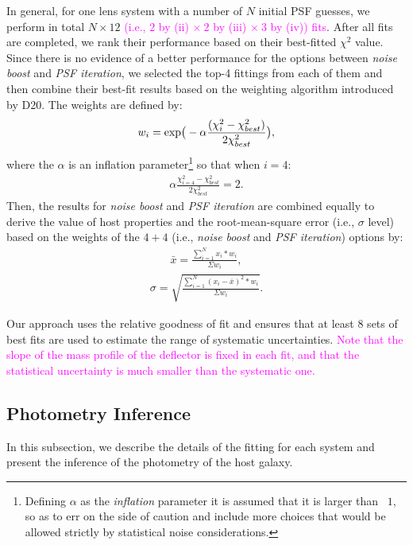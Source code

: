 \documentclass[fleqn,usenatbib]{mnras}
\newcommand{\pink}[1]{{\textcolor{magenta}{#1}}}
\begin{document}
In general, for one lens system with a number of $N$ initial PSF guesses, we perform in total $N\times12$ \pink{(i.e., $2$ by (ii) $\times~2$ by (iii) $\times~3$ by (iv)) fits}. After all fits are completed, we rank their performance based on their best-fitted $\chi^2$ value. Since there is no evidence of a better performance for the options between {\it noise boost} and {\it PSF iteration}, we selected the top-4 fittings from each of them and then combine their best-fit results based on the weighting algorithm introduced by D20. The weights are defined by:
\begin{eqnarray}
\label{eq:weights}
w_i = {\rm exp} \big(- \alpha \frac{ (\chi_i ^2 - \chi_{best} ^2 )}{2 \chi_{best} ^2} \big),
\end{eqnarray} 
where the $\alpha$ is an inflation parameter\footnote{Defining $\alpha$ as the {\it inflation} parameter it is assumed that it is larger than ~$1$, so as to err on the side of caution and include more choices that would be allowed strictly by statistical noise considerations.} so that when $i=4$:
\begin{eqnarray}
\label{eq:alpha}
\alpha \frac{ \chi_{i=4} ^2 - \chi_{best} ^2 }{2 \chi_{best} ^2} = 2.
\end{eqnarray} 
Then, the results for {\it noise boost} and {\it PSF iteration} are combined equally to derive the value of host properties and the root-mean-square error (i.e., $\sigma$ level) based on the weights of the $4+4$ (i.e., {\it noise boost} and {\it PSF iteration}) options by:
\begin{eqnarray}
\label{eq:infer_value}
\bar{x}  =  \frac{  \sum_{i=1}^{N}   x_i * w_i  }{\Sigma w_i} ,
\end{eqnarray} 
\begin{eqnarray}
\label{eq:infer_scatter}
\sigma =   \sqrt{ \frac{  \sum_{i=1}^{N}   (x_i -  \bar{x} ) ^2 * w_i  }{\Sigma w_i} }.
\end{eqnarray} 

Our approach uses the relative goodness of fit and ensures that at least 8 sets of best fits are used to estimate the range of systematic uncertainties. \pink{Note that the slope of the mass profile of the deflector is fixed in each fit, and that the statistical uncertainty is much smaller than the systematic one.} 

\subsection{Photometry Inference}\label{sec:photometry}
In this subsection, we describe the details of the fitting for each system and present the inference of the photometry of the host galaxy.
\end{document}
